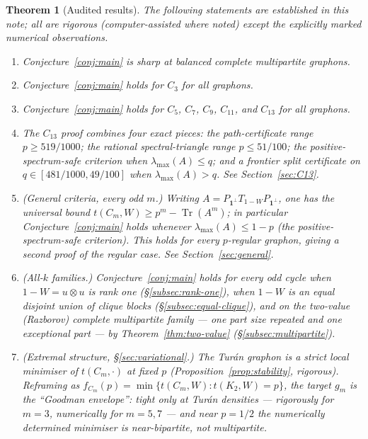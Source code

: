 \documentclass[11pt]{article}
\newtheorem{theorem}{Theorem}[section]
\newcommand{\one}{\mathbf 1}
\newcommand{\Tr}{\operatorname{Tr}}
\begin{document}
\begin{theorem}[Audited results]\label{thm:status}
The following statements are established in this note; all are rigorous (computer-assisted where noted) except the explicitly marked numerical observations.
\begin{enumerate}[label=\textup{(\roman*)}]
    \item Conjecture~\ref{conj:main} is sharp at balanced complete multipartite graphons.
    \item Conjecture~\ref{conj:main} holds for $C_3$ for all graphons.
    \item Conjecture~\ref{conj:main} holds for $C_5$, $C_7$, $C_9$, $C_{11}$, and $C_{13}$ for all graphons.
    \item The $C_{13}$ proof combines four exact pieces: the path-certificate range $p\ge519/1000$; the rational spectral-triangle range $p\le51/100$; the positive-spectrum-safe criterion when $\lambda_{\max}(A)\le q$; and a frontier split certificate on $q\in[481/1000,49/100]$ when $\lambda_{\max}(A)>q$.  See Section~\ref{sec:C13}.
    \item \textup{(General criteria, every odd $m$.)}  Writing $A=P_{\one^\perp}T_{1-W}P_{\one^\perp}$, one has the universal bound $t(C_m,W)\ge p^m-\Tr(A^m)$; in particular Conjecture~\ref{conj:main} holds whenever $\lambda_{\max}(A)\le1-p$ (the positive-spectrum-safe criterion).  This holds for every $p$-regular graphon, giving a second proof of the regular case.  See Section~\ref{sec:general}.
    \item \textup{(All-$k$ families.)}  Conjecture~\ref{conj:main} holds for every odd cycle when $1-W=u\otimes u$ is rank one (\S\ref{subsec:rank-one}), when $1-W$ is an \emph{equal} disjoint union of clique blocks (\S\ref{subsec:equal-clique}), and on the \emph{two-value} (Razborov) complete multipartite family --- one part size repeated and one exceptional part --- by Theorem~\ref{thm:two-value} (\S\ref{subsec:multipartite}).
    \item \textup{(Extremal structure, \S\ref{sec:variational}.)}  The Tur\'an graphon is a strict local minimiser of $t(C_m,\cdot)$ at fixed $p$ (Proposition~\ref{prop:stability}, rigorous).  Reframing as $f_{C_m}(p)=\min\{t(C_m,W):t(K_2,W)=p\}$, the target $g_m$ is the ``Goodman envelope'': tight only at Tur\'an densities --- rigorously for $m=3$, numerically for $m=5,7$ --- and near $p=1/2$ the numerically determined minimiser is near-bipartite, not multipartite.
\end{enumerate}
\end{theorem}
\end{document}
